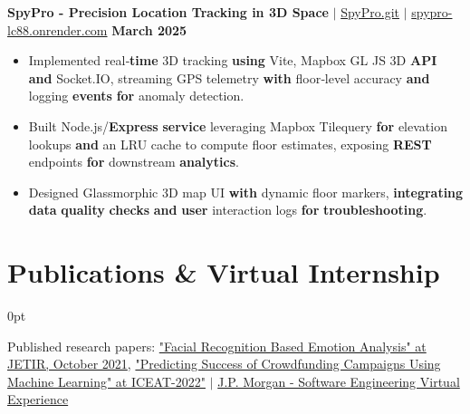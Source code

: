 \documentclass[letterpaper,10pt]{article}
\newlength{\contentindent}
\newcommand{\sectioncontent}[1]{%
  \begin{adjustwidth}{\contentindent}{0pt}%
  #1%
  \end{adjustwidth}%
}
\begin{document}
{\textbf{SpyPro - Precision Location Tracking in 3D Space} $|$ \href{https://github.com/Saurav-Kalaskar/SpyPro.git}{SpyPro.git} $|$ \href{https://spypro-lc88.onrender.com/} {spypro-lc88.onrender.com} \hfill \textbf{March 2025}
\begin{itemize}
    \item Implemented real‑\textbf{time} 3D tracking \textbf{using} Vite, Mapbox GL JS 3D \textbf{API} \textbf{and} Socket.IO, streaming GPS telemetry \textbf{with} floor‑level accuracy \textbf{and} logging \textbf{events} \textbf{for} anomaly detection.
    \item Built Node.js/\textbf{Express} \textbf{service} leveraging Mapbox Tilequery \textbf{for} elevation lookups \textbf{and} an LRU cache to compute floor estimates, exposing \textbf{REST} endpoints \textbf{for} downstream \textbf{analytics}.
    \item Designed Glassmorphic 3D map UI \textbf{with} dynamic floor markers, \textbf{integrating} \textbf{data} \textbf{quality} \textbf{checks} \textbf{and} \textbf{user} interaction logs \textbf{for} \textbf{troubleshooting}.
\end{itemize}
}

\section{Publications \& Virtual Internship}
\sectioncontent{
{Published research papers: \href{https://www.jetir.org/view?paper=JETIRFD06059}{"Facial Recognition Based Emotion Analysis" at JETIR, October 2021}},  \href{https://drive.google.com/file/d/1oAuZegjDGTgZXc2WC4bzxeZQ2XF0wVNs/view?usp=sharing}{"Predicting Success of Crowdfunding Campaigns Using Machine Learning" at ICEAT-2022"} $|$
\href{https://drive.google.com/file/d/1KVM6ewcn56FYNm9yJX6cdct4bhXv-Cez/view?usp=sharing}{J.P. Morgan - Software Engineering Virtual Experience}
}
\end{document}
